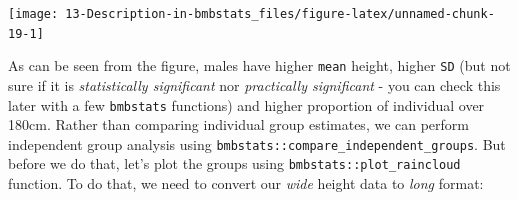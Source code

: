 \documentclass[
]{book}
\newenvironment{Shaded}{\begin{snugshade}}{\end{snugshade}}
\newcommand{\DataTypeTok}[1]{\textcolor[rgb]{0.13,0.29,0.53}{#1}}
\newcommand{\DecValTok}[1]{\textcolor[rgb]{0.00,0.00,0.81}{#1}}
\newcommand{\FloatTok}[1]{\textcolor[rgb]{0.00,0.00,0.81}{#1}}
\newcommand{\KeywordTok}[1]{\textcolor[rgb]{0.13,0.29,0.53}{\textbf{#1}}}
\newcommand{\NormalTok}[1]{#1}
\newcommand{\OperatorTok}[1]{\textcolor[rgb]{0.81,0.36,0.00}{\textbf{#1}}}
\newcommand{\StringTok}[1]{\textcolor[rgb]{0.31,0.60,0.02}{#1}}
\begin{document}
\begin{Shaded}
\end{Shaded}

\begin{center}\texttt{[image: 13-Description-in-bmbstats\_files/figure-latex/unnamed-chunk-19-1]} \end{center}

As can be seen from the figure, males have higher \texttt{mean} height, higher \texttt{SD} (but not sure if it is \emph{statistically significant} nor \emph{practically significant} - you can check this later with a few \texttt{bmbstats} functions) and higher proportion of individual over 180cm.
Rather than comparing individual group estimates, we can perform independent group analysis using \texttt{bmbstats::compare\_independent\_groups}. But before we do that, let's plot the groups using \texttt{bmbstats::plot\_raincloud} function. To do that, we need to convert our \emph{wide} height data to \emph{long} format:
\end{document}
